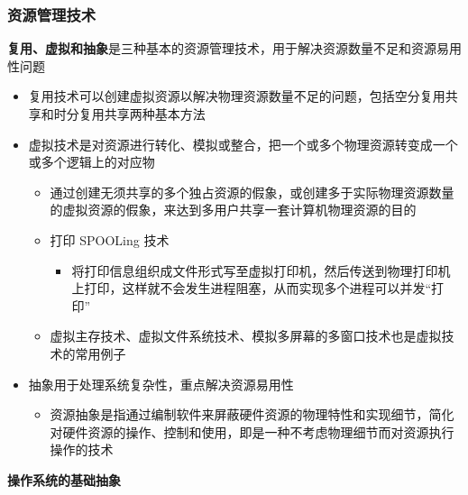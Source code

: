 \documentclass[cs4size,a4paper,10pt]{ctexart}
\begin{document}
		\subsubsection{资源管理技术}
		\textbf{复用、虚拟和抽象}是三种基本的资源管理技术，用于解决资源数量不足和资源易用性问题
		\begin{itemize}
			\item 复用技术可以创建虚拟资源以解决物理资源数量不足的问题，包括空分复用共享和时分复用共享两种基本方法
			\item 虚拟技术是对资源进行转化、模拟或整合，把一个或多个物理资源转变成一个或多个逻辑上的对应物
			\begin{itemize}
				\item 通过创建无须共享的多个独占资源的假象，或创建多于实际物理资源数量的虚拟资源的假象，来达到多用户共享一套计算机物理资源的目的
				\item 打印 SPOOLing 技术
				\begin{itemize}
					\item 将打印信息组织成文件形式写至虚拟打印机，然后传送到物理打印机上打印，这样就不会发生进程阻塞，从而实现多个进程可以并发“打印”
				\end{itemize}
				\item 虚拟主存技术、虚拟文件系统技术、模拟多屏幕的多窗口技术也是虚拟技术的常用例子
			\end{itemize}
			\item 抽象用于处理系统复杂性，重点解决资源易用性
			\begin{itemize}
				\item 资源抽象是指通过编制软件来屏蔽硬件资源的物理特性和实现细节，简化对硬件资源的操作、控制和使用，即是一种不考虑物理细节而对资源执行操作的技术
			\end{itemize}
		\end{itemize}

		\textbf{操作系统的基础抽象}
\end{document}
